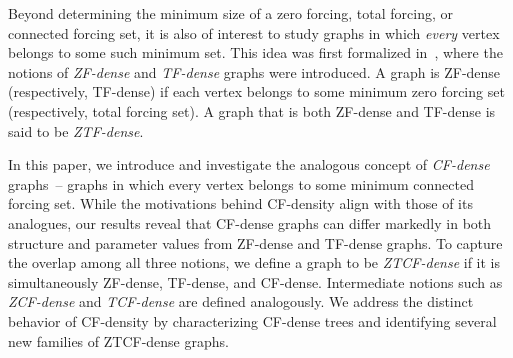 \documentclass[11pt]{article}
\theoremstyle{definition}
\newcommand{\1}{\vspace{0.1cm}}
\newcommand{\2}{\vspace{0.2cm}}
\newcommand{\3}{\vspace{0.3cm}}
\begin{document}
Beyond determining the minimum size of a zero forcing, total forcing, or connected forcing set, it is also of interest to study graphs in which \emph{every} vertex belongs to some such minimum set. This idea was first formalized in~\cite{DaHePe2023a}, where the notions of \emph{ZF-dense} and \emph{TF-dense} graphs were introduced. A graph is ZF-dense (respectively, TF-dense) if each vertex belongs to some minimum zero forcing set (respectively, total forcing set). A graph that is both ZF-dense and TF-dense is said to be \emph{ZTF-dense}.

In this paper, we introduce and investigate the analogous concept of \emph{CF-dense} graphs~-- graphs in which every vertex belongs to some minimum connected forcing set. While the motivations behind CF-density align with those of its analogues, our results reveal that CF-dense graphs can differ markedly in both structure and parameter values from ZF-dense and TF-dense graphs. To capture the overlap among all three notions, we define a graph to be \emph{ZTCF-dense} if it is simultaneously ZF-dense, TF-dense, and CF-dense. Intermediate notions such as \emph{ZCF-dense} and \emph{TCF-dense} are defined analogously. We address the distinct behavior of CF-density by characterizing CF-dense trees and identifying several new families of ZTCF-dense graphs.







\end{document}
